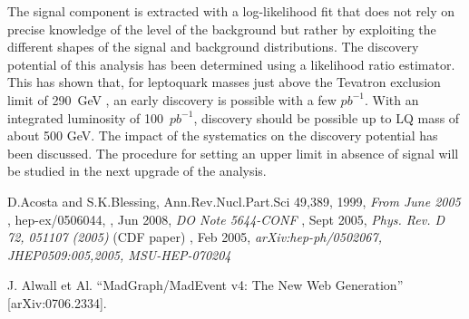 \documentclass{cmspaper}
\begin{document}
\begin{linenumbers}
The signal component is extracted with a log-likelihood fit that does not rely on precise knowledge
of the level of the background but rather by exploiting the different shapes of the signal and background
distributions. 
The discovery potential of this analysis has been determined using a likelihood 
ratio estimator. This has shown that, for leptoquark masses just above the Tevatron exclusion limit of 290~GeV
\cite{d02008}, an early discovery is possible with a few $pb^{-1}$.
With an integrated luminosity of 100~$pb^{-1}$, discovery should be possible up
to LQ mass of about 500 GeV.
The impact of the systematics on the discovery potential has been discussed.
The procedure for setting an upper limit in absence of signal will be studied 
in the next upgrade of the analysis.



\begin{thebibliography}{}

 {D.Acosta and S.K.Blessing, Ann.Rev.Nucl.Part.Sci 49,389},
  1999,
  {\em From June 2005}
, hep-ex/0506044,
, Jun 2008,
  {\em DO Note 5644-CONF}
, Sept 2005,
  {\em Phys. Rev. D 72, 051107 (2005)} (CDF paper)
, Feb 2005,
  {\em arXiv:hep-ph/0502067, JHEP0509:005,2005, MSU-HEP-070204}
  
  
  J. Alwall et Al.
  ``MadGraph/MadEvent v4: The New Web Generation''
  [arXiv:0706.2334].
  
  

\end{thebibliography}
\end{linenumbers}
\end{document}
